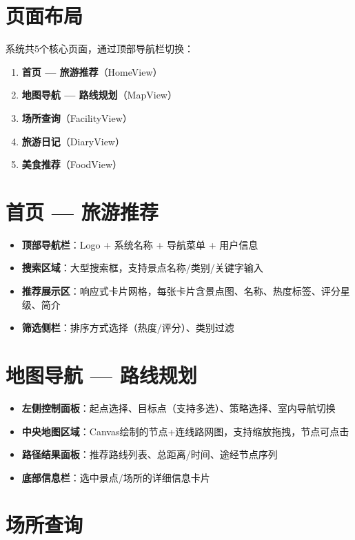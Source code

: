 \documentclass[12pt,a4paper]{report}
\begin{document}
\section{页面布局}

系统共5个核心页面，通过顶部导航栏切换：

\begin{enumerate}
    \item \textbf{首页 --- 旅游推荐}（HomeView）
    \item \textbf{地图导航 --- 路线规划}（MapView）
    \item \textbf{场所查询}（FacilityView）
    \item \textbf{旅游日记}（DiaryView）
    \item \textbf{美食推荐}（FoodView）
\end{enumerate}

\section{首页 --- 旅游推荐}

\begin{itemize}
    \item \textbf{顶部导航栏}：Logo + 系统名称 + 导航菜单 + 用户信息
    \item \textbf{搜索区域}：大型搜索框，支持景点名称/类别/关键字输入
    \item \textbf{推荐展示区}：响应式卡片网格，每张卡片含景点图、名称、热度标签、评分星级、简介
    \item \textbf{筛选侧栏}：排序方式选择（热度/评分）、类别过滤
\end{itemize}

\section{地图导航 --- 路线规划}

\begin{itemize}
    \item \textbf{左侧控制面板}：起点选择、目标点（支持多选）、策略选择、室内导航切换
    \item \textbf{中央地图区域}：Canvas绘制的节点+连线路网图，支持缩放拖拽，节点可点击
    \item \textbf{路径结果面板}：推荐路线列表、总距离/时间、途经节点序列
    \item \textbf{底部信息栏}：选中景点/场所的详细信息卡片
\end{itemize}

\section{场所查询}
\end{document}
